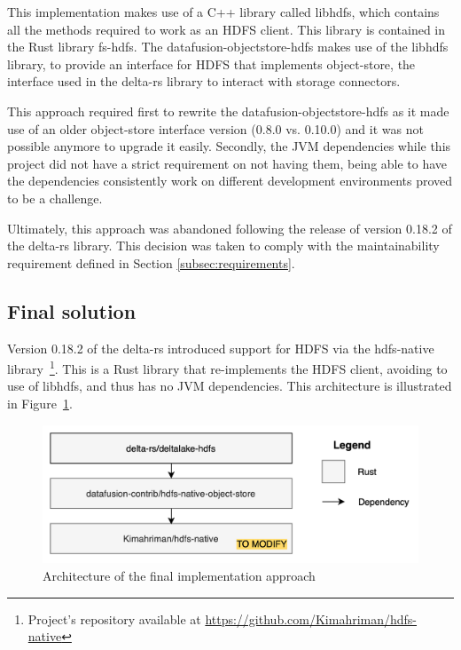 This implementation makes use of a C++ library called libhdfs, which contains all the methods required to work as an \gls{HDFS} client. This library is contained in the Rust library fs-hdfs. The datafusion-objectstore-hdfs makes use of the libhdfs library, to provide an interface for \gls{HDFS} that implements object-store, the interface used in the delta-rs library to interact with storage connectors.

This approach required first to rewrite the datafusion-objectstore-hdfs as it made use of an older object-store interface version (0.8.0 vs. 0.10.0) and it was not possible anymore to upgrade it easily. Secondly, the \gls{JVM} dependencies while this project did not have a strict requirement on not having them, being able to have the dependencies consistently work on different development environments proved to be a challenge. 

Ultimately, this approach was abandoned following the release of version 0.18.2 of the delta-rs library. This decision was taken to comply with the maintainability requirement defined in Section \ref{subsec:requirements}.

\subsection{Final solution}

Version 0.18.2 of the delta-rs introduced support for \gls{HDFS} via the hdfs-native library~\footnote{Project's repository available at \url{https://github.com/Kimahriman/hdfs-native}}. This is a Rust library that re-implements the \gls{HDFS} client, avoiding to use of libhdfs, and thus has no \gls{JVM} dependencies. This architecture is illustrated in Figure~\ref{fig:approach_2_solution_schema}.

\begin{figure}[!ht]
  \begin{center}
    \includegraphics[width=\textwidth]{figures/4-implementation/hdfs-native.png}
  \caption{Architecture of the final implementation approach}
  \label{fig:approach_2_solution_schema}
  \end{center}
\end{figure}

